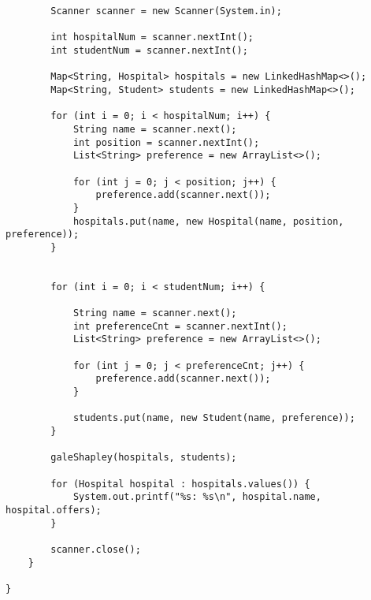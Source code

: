 \documentclass[14pt, a4paper]{article}
\begin{document}
\begin{verbatim}
        Scanner scanner = new Scanner(System.in);

        int hospitalNum = scanner.nextInt();
        int studentNum = scanner.nextInt();

        Map<String, Hospital> hospitals = new LinkedHashMap<>();
        Map<String, Student> students = new LinkedHashMap<>();

        for (int i = 0; i < hospitalNum; i++) {
            String name = scanner.next();
            int position = scanner.nextInt();
            List<String> preference = new ArrayList<>();

            for (int j = 0; j < position; j++) {
                preference.add(scanner.next());
            }
            hospitals.put(name, new Hospital(name, position, preference));
        }


        for (int i = 0; i < studentNum; i++) {

            String name = scanner.next();
            int preferenceCnt = scanner.nextInt();
            List<String> preference = new ArrayList<>();

            for (int j = 0; j < preferenceCnt; j++) {
                preference.add(scanner.next());
            }

            students.put(name, new Student(name, preference));
        }

        galeShapley(hospitals, students);

        for (Hospital hospital : hospitals.values()) {
            System.out.printf("%s: %s\n", hospital.name, hospital.offers);
        }

        scanner.close();
    }

}
\end{verbatim}    
\end{document}

